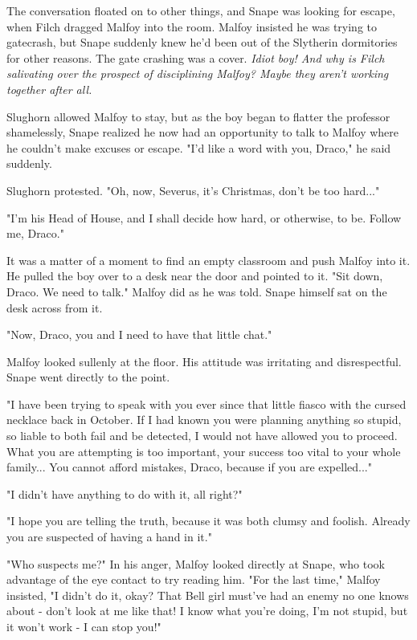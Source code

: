 \documentclass[a4paper,11pt]{article}
\begin{document}
The conversation floated on to other things, and Snape was looking for escape, when Filch dragged Malfoy into the room. Malfoy insisted he was trying to gatecrash, but Snape suddenly knew he'd been out of the Slytherin dormitories for other reasons. The gate crashing was a cover. \emph{Idiot boy! And why is Filch salivating over the prospect of disciplining Malfoy? Maybe they aren't working together after all.}

Slughorn allowed Malfoy to stay, but as the boy began to flatter the professor shamelessly, Snape realized he now had an opportunity to talk to Malfoy where he couldn't make excuses or escape. "I'd like a word with you, Draco," he said suddenly.

Slughorn protested. "Oh, now, Severus, it's Christmas, don't be too hard..."

"I'm his Head of House, and I shall decide how hard, or otherwise, to be. Follow me, Draco."

It was a matter of a moment to find an empty classroom and push Malfoy into it. He pulled the boy over to a desk near the door and pointed to it. "Sit down, Draco. We need to talk." Malfoy did as he was told. Snape himself sat on the desk across from it.

"Now, Draco, you and I need to have that little chat."

Malfoy looked sullenly at the floor. His attitude was irritating and disrespectful. Snape went directly to the point.

"I have been trying to speak with you ever since that little fiasco with the cursed necklace back in October. If I had known you were planning anything so stupid, so liable to both fail and be detected, I would not have allowed you to proceed. What you are attempting is too important, your success too vital to your whole family... You cannot afford mistakes, Draco, because if you are expelled..."

"I didn't have anything to do with it, all right?"

"I hope you are telling the truth, because it was both clumsy and foolish. Already you are suspected of having a hand in it."

"Who suspects me?" In his anger, Malfoy looked directly at Snape, who took advantage of the eye contact to try reading him. "For the last time," Malfoy insisted, "I didn't do it, okay? That Bell girl must've had an enemy no one knows about - don't look at me like that! I know what you're doing, I'm not stupid, but it won't work - I can stop you!"
\end{document}
